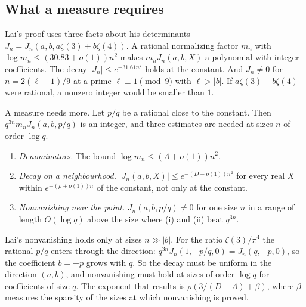\documentclass[11pt]{amsart}
\theoremstyle{definition}
\theoremstyle{remark}
\numberwithin{equation}{section}
\begin{document}
\subsection{What a measure requires}\label{ssec:require}
Lai's proof uses three facts about his determinants $J_n=J_n(a,b,a\zeta(3)+b\zeta(4))$. A rational normalizing factor
$m_n$ with $\log m_n\le(30.83+o(1))n^2$ makes $m_nJ_n(a,b,X)$ a polynomial with integer coefficients. The decay
$|J_n|\le e^{-31.61n^2}$ holds at the constant. And $J_n\ne0$ for $n=2(\ell-1)/9$ at a prime $\ell\equiv1\pmod9$ with
$\ell>|b|$. If $a\zeta(3)+b\zeta(4)$ were rational, a nonzero integer would be smaller than $1$.

A measure needs more. Let $p/q$ be a rational close to the constant. Then $q^{3n}m_nJ_n(a,b,p/q)$ is an integer, and
three estimates are needed at sizes $n$ of order $\log q$.
\begin{enumerate}[label=(\roman*)]
\item \emph{Denominators.} The bound $\log m_n\le(\Lambda+o(1))n^2$.
\item \emph{Decay on a neighbourhood.} $|J_n(a,b,X)|\le e^{-(D-o(1))n^2}$ for every real $X$ within
 $e^{-(\rho+o(1))n}$ of the constant, not only at the constant.
\item \emph{Nonvanishing near the point.} $J_n(a,b,p/q)\ne0$ for one size $n$ in a range of length
 $O(\log q)$ above the size where (i) and (ii) beat $q^{3n}$.
\end{enumerate}
Lai's nonvanishing holds only at sizes $n\gg|b|$. For the ratio $\zeta(3)/\pi^4$ the rational $p/q$ enters through
the direction: $q^{3n}J_n(1,-p/q,0)=J_n(q,-p,0)$, so the coefficient $b=-p$ grows with $q$. So the decay must be
uniform in the direction $(a,b)$, and nonvanishing must hold at sizes of order $\log q$ for coefficients of size $q$.
The exponent that results is $\rho(3/(D-\Lambda)+\beta)$, where $\beta$ measures the sparsity of the sizes at which
nonvanishing is proved.
\end{document}
